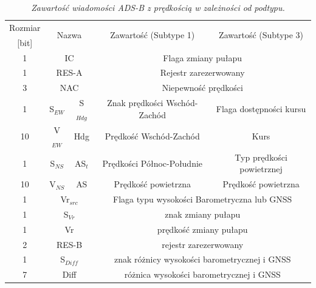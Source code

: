 \documentclass[eng,printmode]{mgr}
\begin{document}
\begin{table}[htb]
\def\arraystretch{1.3}%
\caption{\textit{ Zawartość wiadomości ADS-B z prędkością w zależności od podtypu.}}
\label{tab:adsb}
  \centering
  \def\arraystretch{1.2}%
  \begin{tabular}{|c|c|c|c|c|}
  \hline
  \multicolumn{1}{|c|}{Rozmiar} & \multicolumn{2}{c|}{\multirow{2}{*}{Nazwa}} & \multicolumn{1}{c|}{\multirow{2}{*}{Zawartość (Subtype 1)}}  & \multicolumn{1}{c|}{\multirow{2}{*}{Zawartość (Subtype 3)}}\\
  \multicolumn{1}{|c|}{[bit]} & \multicolumn{2}{c|}{} & \multicolumn{1}{c|}{}& \multicolumn{1}{c|}{}\\\cline{1-5}
  
  \multicolumn{1}{|c|}{1} & \multicolumn{2}{c|}{IC} & \multicolumn{2}{c|}{Flaga zmiany pułapu}\\\cline{1-5}
  \multicolumn{1}{|c|}{1} & \multicolumn{2}{c|}{RES-A} & \multicolumn{2}{c|}{Rejestr zarezerwowany}\\\cline{1-5}
  \multicolumn{1}{|c|}{3} & \multicolumn{2}{c|}{NAC} & \multicolumn{2}{c|}{Niepewność prędkości}\\\cline{1-5}
  \multicolumn{1}{|c|}{1} & \multicolumn{1}{c|}{S$_{EW}$} & \multicolumn{1}{c|}{S$_{Hdg}$} & \multicolumn{1}{c|}{Znak prędkości Wschód-Zachód} & \multicolumn{1}{c|}{Flaga dostępności kursu} \\\cline{1-5}
  \multicolumn{1}{|c|}{10} & \multicolumn{1}{c|}{V$_{EW}$} & \multicolumn{1}{c|}{Hdg} & \multicolumn{1}{c|}{Prędkość Wschód-Zachód}& \multicolumn{1}{c|}{Kurs}\\\cline{1-5}
  \multicolumn{1}{|c|}{1} & \multicolumn{1}{c|}{S$_{NS}$} & \multicolumn{1}{c|}{AS$_t$} & \multicolumn{1}{c|}{Prędkości Północ-Południe} & \multicolumn{1}{c|}{Typ prędkości powietrznej}\\\cline{1-5}
  \multicolumn{1}{|c|}{10} & \multicolumn{1}{c|}{V$_{NS}$} & \multicolumn{1}{c|}{AS}  & \multicolumn{1}{c|}{Prędkość powietrzna}& \multicolumn{1}{c|}{Prędkość powietrzna}\\\cline{1-5}
  \multicolumn{1}{|c|}{1} & \multicolumn{2}{c|}{Vr$_{src}$} & \multicolumn{2}{c|}{Flaga typu wysokości Barometryczna lub GNSS}\\\cline{1-5}
  \multicolumn{1}{|c|}{1} & \multicolumn{2}{c|}{S$_{Vr}$} & \multicolumn{2}{c|}{znak zmiany pułapu}\\\cline{1-5}
  \multicolumn{1}{|c|}{1} & \multicolumn{2}{c|}{Vr} & \multicolumn{2}{c|}{prędkość zmiany pułapu}\\\cline{1-5}
  \multicolumn{1}{|c|}{2} & \multicolumn{2}{c|}{RES-B} & \multicolumn{2}{c|}{rejestr zarezerwowany}\\\cline{1-5}
  \multicolumn{1}{|c|}{1} & \multicolumn{2}{c|}{S$_{Diff}$} & \multicolumn{2}{c|}{znak różnicy wysokości barometrycznej i GNSS}\\\cline{1-5}
  \multicolumn{1}{|c|}{7} & \multicolumn{2}{c|}{Diff} & \multicolumn{2}{c|}{różnica wysokości barometrycznej i GNSS}\\\cline{1-5}
       
 \end{tabular}
\end{table}
\end{document}
